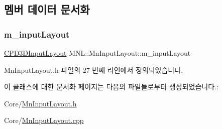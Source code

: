\subsection{멤버 데이터 문서화}
\mbox{\label{class_m_n_l_1_1_mn_input_layout_aa22d16128ed283827f88cd87044fcb36}} 
\subsubsection{\texorpdfstring{m\+\_\+input\+Layout}{m\_inputLayout}}
{\footnotesize\ttfamily \hyperlink{namespace_m_n_l_aec7a2a132d6e72492d5feb5926d838dd}{C\+P\+D3\+D\+Input\+Layout} M\+N\+L\+::\+Mn\+Input\+Layout\+::m\+\_\+input\+Layout\hspace{0.3cm}{\ttfamily [private]}}



Mn\+Input\+Layout.\+h 파일의 27 번째 라인에서 정의되었습니다.



이 클래스에 대한 문서화 페이지는 다음의 파일들로부터 생성되었습니다.\+:\begin{DoxyCompactItemize}
\item 
Core/\hyperlink{_mn_input_layout_8h}{Mn\+Input\+Layout.\+h}\item 
Core/\hyperlink{_mn_input_layout_8cpp}{Mn\+Input\+Layout.\+cpp}\end{DoxyCompactItemize}
